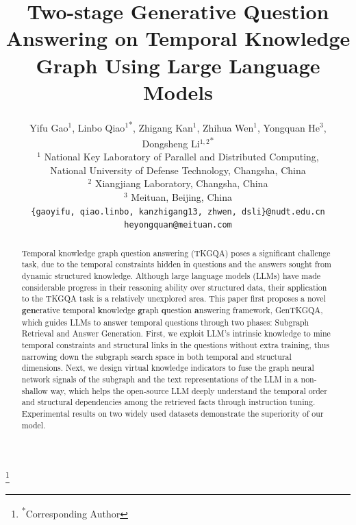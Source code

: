 \documentclass[11pt]{article}
\title{Two-stage Generative Question Answering on Temporal Knowledge Graph Using Large Language Models}
\author{Yifu Gao$^1$, Linbo Qiao$^1$\textsuperscript{*}, Zhigang Kan$^1$, Zhihua Wen$^1$, Yongquan He$^3$, Dongsheng Li$^{1,2}$\textsuperscript{*}\\
        $^1$ National Key Laboratory of Parallel and Distributed Computing, \\
        National University of Defense Technology, Changsha, China\\ 
        $^2$ Xiangjiang Laboratory, Changsha, China\\ 
        $^3$ Meituan, Beijing, China\\
        \texttt{\{gaoyifu, qiao.linbo, kanzhigang13, zhwen,  dsli\}@nudt.edu.cn} \\
        \texttt{heyongquan@meituan.com} }
\newcommand{\blfootnote}[1]{
    \begingroup
    \renewcommand\thefootnote{}\footnote{#1}
    \addtocounter{footnote}{-1}
    \endgroup
}
\begin{document}
\maketitle
\blfootnote{\textsuperscript{*}Corresponding Author}

\begin{abstract}

Temporal knowledge graph question answering (TKGQA) poses a significant challenge task, due to the temporal constraints hidden in questions and the answers sought from dynamic structured knowledge.
Although large language models (LLMs) have made considerable progress in their reasoning ability over structured data, their application to the TKGQA task is a relatively unexplored area.
This paper first proposes a novel \textbf{gen}erative \textbf{t}emporal \textbf{k}nowledge \textbf{g}raph \textbf{q}uestion \textbf{a}nswering framework, GenTKGQA, which guides LLMs to answer temporal questions through two phases: Subgraph Retrieval and Answer Generation. 
First, we exploit LLM's intrinsic knowledge to mine temporal constraints and structural links in the questions without extra training, thus narrowing down the subgraph search space in both temporal and structural dimensions.
Next, we design virtual knowledge indicators to fuse the graph neural network signals of the subgraph and the text representations of the LLM in a non-shallow way, which helps the open-source LLM deeply understand the temporal order and structural dependencies among the retrieved facts through instruction tuning.  
Experimental results on two widely used datasets demonstrate the superiority of our model.


\end{abstract}
\end{document}

